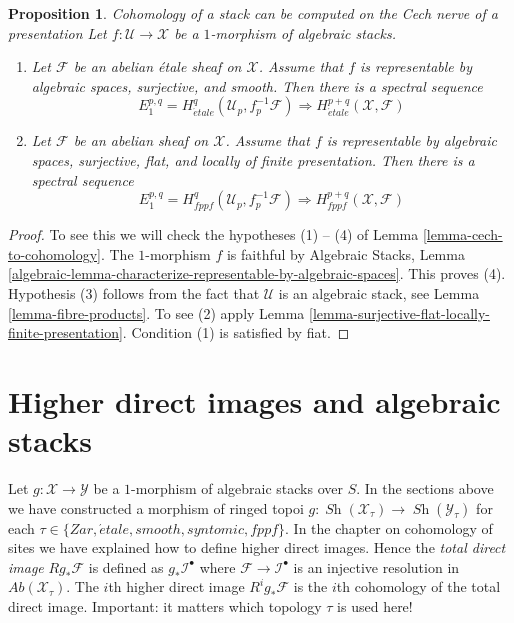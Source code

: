 \documentclass{stacks-project}
\newenvironment{slogan}{\comment}{\endcomment}
\theoremstyle{plain}
\newtheorem{proposition}[subsection]{Proposition}
\theoremstyle{definition}
\theoremstyle{remark}
\numberwithin{equation}{subsection}
\def\Sh{\mathop{\mathit{Sh}}\nolimits}
\def\etale{{\acute{e}tale}}
\begin{document}
\begin{proposition}
\label{proposition-smooth-covering-compute-cohomology}
\begin{slogan}
Cohomology of a stack can be computed on the Cech nerve of a presentation
\end{slogan}
Let $f : \mathcal{U} \to \mathcal{X}$ be a $1$-morphism of algebraic stacks.
\begin{enumerate}
\item Let $\mathcal{F}$ be an abelian \'etale sheaf on $\mathcal{X}$.
Assume that $f$ is representable by algebraic spaces, surjective, and smooth.
Then there is a spectral sequence
$$
E_1^{p, q} = H^q_\etale(\mathcal{U}_p, f_p^{-1}\mathcal{F})
\Rightarrow
H^{p + q}_\etale(\mathcal{X}, \mathcal{F})
$$
\item Let $\mathcal{F}$ be an abelian sheaf on $\mathcal{X}$.
Assume that $f$ is representable by algebraic spaces, surjective, flat,
and locally of finite presentation. Then there is
a spectral sequence
$$
E_1^{p, q} = H^q_{fppf}(\mathcal{U}_p, f_p^{-1}\mathcal{F})
\Rightarrow
H^{p + q}_{fppf}(\mathcal{X}, \mathcal{F})
$$
\end{enumerate}
\end{proposition}

\begin{proof}
To see this we will check the hypotheses (1) -- (4) of
Lemma \ref{lemma-cech-to-cohomology}.
The $1$-morphism $f$ is faithful by
Algebraic Stacks, Lemma
\ref{algebraic-lemma-characterize-representable-by-algebraic-spaces}.
This proves (4).
Hypothesis (3) follows from the fact that $\mathcal{U}$ is an algebraic
stack, see
Lemma \ref{lemma-fibre-products}.
To see (2) apply
Lemma \ref{lemma-surjective-flat-locally-finite-presentation}.
Condition (1) is satisfied by fiat.
\end{proof}










\section{Higher direct images and algebraic stacks}
\label{section-higher-direct-images}

\noindent
Let $g : \mathcal{X} \to \mathcal{Y}$ be a $1$-morphism of algebraic stacks
over $S$. In the sections above we have constructed a morphism of ringed
topoi $g : \Sh(\mathcal{X}_\tau) \to \Sh(\mathcal{Y}_\tau)$
for each $\tau \in \{Zar, \etale, smooth, syntomic, fppf\}$.
In the chapter on cohomology of sites we have explained how to
define higher direct images. Hence the {\it total direct image}
$Rg_*\mathcal{F}$ is defined as $g_*\mathcal{I}^\bullet$ where
$\mathcal{F} \to \mathcal{I}^\bullet$ is an injective resolution in
$\textit{Ab}(\mathcal{X}_\tau)$. The $i$th higher direct image
$R^ig_*\mathcal{F}$ is the $i$th cohomology of the total direct image.
Important: it matters which topology $\tau$ is used here!
\end{document}
